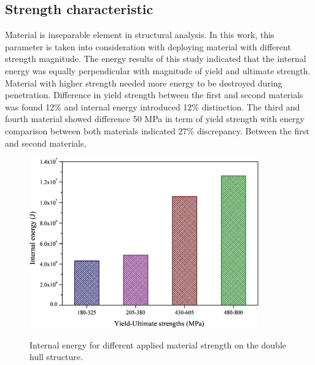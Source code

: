\documentclass[../Final.tex]{subfiles}
\begin{document}
\subsection{Strength characteristic}

Material is inseparable element in structural analysis. In this work, this parameter is taken into consideration with deploying material with different strength magnitude. 
The energy results of this study indicated that the internal energy was equally perpendicular with magnitude of yield and ultimate strength. 
Material with higher strength needed more energy to be destroyed during penetration. Difference in yield strength between the first and second materials was found 12\% and internal energy introduced 12\% distinction. 
The third and fourth material showed difference 50 MPa in term of yield strength with energy comparison between both materials indicated 27\% discrepancy. Between the first and second materials, 

\begin{figure}[ht]
    \centering
    \includegraphics[width=\columnwidth]{fig9.jpg}
    \label{fig9}
    \caption{Internal energy for different applied material strength on the double hull structure.}
\end{figure}
\end{document}
